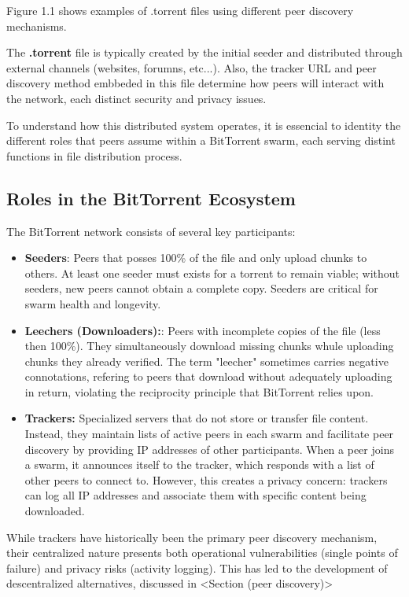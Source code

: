 Figure 1.1 shows examples of .torrent files using different peer discovery mechanisms.

The \textbf{.torrent} file is typically created by the initial seeder and distributed through external channels (websites, forumns, etc...). Also, the tracker URL and peer discovery method embbeded in this file determine how peers will interact with the network, each distinct security and privacy issues.

To understand how this distributed system operates, it is essencial to identity the different roles that peers assume within a BitTorrent swarm, each serving distint functions in file distribution process.

\subsection{Roles in the BitTorrent Ecosystem}
The BitTorrent network consists of several key participants:

\begin{itemize}
  \item \textbf{Seeders}: Peers that posses 100\% of the file and only upload chunks to others. At least one seeder must exists for a torrent to remain viable; without seeders, new peers cannot obtain a complete copy. Seeders are critical for swarm health and longevity.

  \item \textbf{Leechers (Downloaders):}: Peers with incomplete copies of the file (less then 100\%). They simultaneously download missing chunks whule uploading chunks they already verified. The term "leecher" sometimes carries negative connotations, refering to peers that download without adequately uploading in return, violating the reciprocity principle that BitTorrent relies upon.

  \item \textbf{Trackers:} Specialized servers that do not store or transfer file content. Instead, they maintain lists of active peers in each swarm and facilitate peer discovery by providing IP addresses of other participants. When a peer joins a swarm, it announces itself to the tracker, which responds with a list of other peers to connect to. However, this creates a privacy concern: trackers can log all IP addresses and associate them with specific content being downloaded.
\end{itemize}

While trackers have historically been the primary peer discovery mechanism, their centralized nature presents both operational vulnerabilities (single points of failure) and privacy risks (activity logging). This has led to the development of descentralized alternatives, discussed in <Section (peer discovery)>

